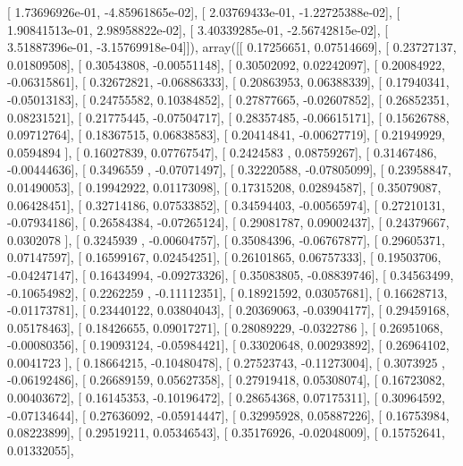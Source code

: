 \documentclass{article}
\begin{document}
       [  1.73696926e-01,  -4.85961865e-02],
       [  2.03769433e-01,  -1.22725388e-02],
       [  1.90841513e-01,   2.98958822e-02],
       [  3.40339285e-01,  -2.56742815e-02],
       [  3.51887396e-01,  -3.15769918e-04]]), array([[ 0.17256651,  0.07514669],
       [ 0.23727137,  0.01809508],
       [ 0.30543808, -0.00551148],
       [ 0.30502092,  0.02242097],
       [ 0.20084922, -0.06315861],
       [ 0.32672821, -0.06886333],
       [ 0.20863953,  0.06388339],
       [ 0.17940341, -0.05013183],
       [ 0.24755582,  0.10384852],
       [ 0.27877665, -0.02607852],
       [ 0.26852351,  0.08231521],
       [ 0.21775445, -0.07504717],
       [ 0.28357485, -0.06615171],
       [ 0.15626788,  0.09712764],
       [ 0.18367515,  0.06838583],
       [ 0.20414841, -0.00627719],
       [ 0.21949929,  0.0594894 ],
       [ 0.16027839,  0.07767547],
       [ 0.2424583 ,  0.08759267],
       [ 0.31467486, -0.00444636],
       [ 0.3496559 , -0.07071497],
       [ 0.32220588, -0.07805099],
       [ 0.23958847,  0.01490053],
       [ 0.19942922,  0.01173098],
       [ 0.17315208,  0.02894587],
       [ 0.35079087,  0.06428451],
       [ 0.32714186,  0.07533852],
       [ 0.34594403, -0.00565974],
       [ 0.27210131, -0.07934186],
       [ 0.26584384, -0.07265124],
       [ 0.29081787,  0.09002437],
       [ 0.24379667,  0.0302078 ],
       [ 0.3245939 , -0.00604757],
       [ 0.35084396, -0.06767877],
       [ 0.29605371,  0.07147597],
       [ 0.16599167,  0.02454251],
       [ 0.26101865,  0.06757333],
       [ 0.19503706, -0.04247147],
       [ 0.16434994, -0.09273326],
       [ 0.35083805, -0.08839746],
       [ 0.34563499, -0.10654982],
       [ 0.2262259 , -0.11112351],
       [ 0.18921592,  0.03057681],
       [ 0.16628713, -0.01173781],
       [ 0.23440122,  0.03804043],
       [ 0.20369063, -0.03904177],
       [ 0.29459168,  0.05178463],
       [ 0.18426655,  0.09017271],
       [ 0.28089229, -0.0322786 ],
       [ 0.26951068, -0.00080356],
       [ 0.19093124, -0.05984421],
       [ 0.33020648,  0.00293892],
       [ 0.26964102,  0.0041723 ],
       [ 0.18664215, -0.10480478],
       [ 0.27523743, -0.11273004],
       [ 0.3073925 , -0.06192486],
       [ 0.26689159,  0.05627358],
       [ 0.27919418,  0.05308074],
       [ 0.16723082,  0.00403672],
       [ 0.16145353, -0.10196472],
       [ 0.28654368,  0.07175311],
       [ 0.30964592, -0.07134644],
       [ 0.27636092, -0.05914447],
       [ 0.32995928,  0.05887226],
       [ 0.16753984,  0.08223899],
       [ 0.29519211,  0.05346543],
       [ 0.35176926, -0.02048009],
       [ 0.15752641,  0.01332055],
\end{document}
